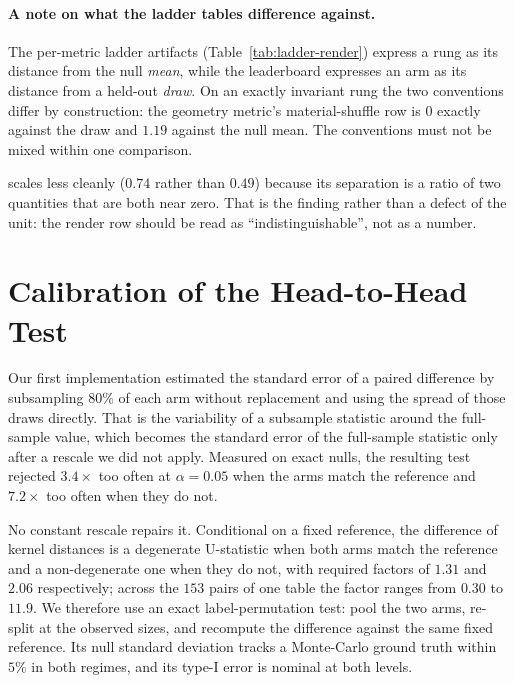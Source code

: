 \paragraph{A note on what the ladder tables difference against.} The
per-metric ladder artifacts (Table~\ref{tab:ladder-render}) express a rung as
its distance from the null \emph{mean}, while the leaderboard expresses an arm
as its distance from a held-out \realheld{} \emph{draw}. On an exactly
invariant rung the two conventions differ by construction: the geometry metric's
material-shuffle row is $0$ exactly against the \realheld{} draw and $1.19$
against the null mean. The conventions must not be mixed within one comparison.

\mvkid{} scales less cleanly ($0.74$ rather than $0.49$) because its separation
is a ratio of two quantities that are both near zero. That is the finding rather
than a defect of the unit: the render row should be read as
``indistinguishable'', not as a number.

\section{Calibration of the Head-to-Head Test}
\label{app:significance}

Our first implementation estimated the standard error of a paired difference by
subsampling $80\%$ of each arm without replacement and using the spread of those
draws directly. That is the variability of a subsample statistic around the
full-sample value, which becomes the standard error of the full-sample statistic
only after a rescale we did not apply. Measured on exact nulls, the resulting
test rejected $3.4\times$ too often at $\alpha{=}0.05$ when the arms match the
reference and $7.2\times$ too often when they do not.

No constant rescale repairs it. Conditional on a fixed reference, the difference
of kernel distances is a degenerate U-statistic when both arms match the
reference and a non-degenerate one when they do not, with required factors of
$1.31$ and $2.06$ respectively; across the $153$ pairs of one table the factor
ranges from $0.30$ to $11.9$. We therefore use an exact label-permutation test:
pool the two arms, re-split at the observed sizes, and recompute the difference
against the same fixed reference. Its null standard deviation tracks a
Monte-Carlo ground truth within $5\%$ in both regimes, and its type-I error is
nominal at both levels.

